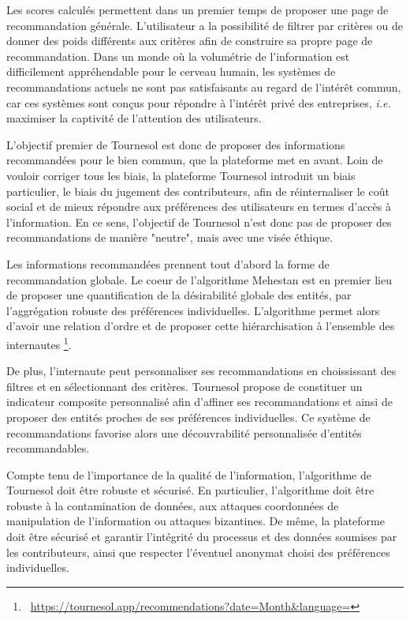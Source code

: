 Les scores calculés permettent dans un premier temps de proposer une page de recommandation générale. L'utilisateur a la possibilité de filtrer par critères ou de donner des poids différents aux critères afin de construire sa propre page de recommandation. Dans un monde où la volumétrie de l'information est difficilement appréhendable pour le cerveau humain, les systèmes de recommandations actuels ne sont pas satisfaisants au regard de l'intérêt commun, car ces systèmes sont conçus pour répondre à l'intérêt privé des entreprises, \textit{i.e.} maximiser la captivité de l'attention des utilisateurs. 

L'objectif premier de Tournesol est donc de proposer des informations recommandées pour le bien commun, que la plateforme met en avant. Loin de vouloir corriger tous les biais, la plateforme Tournesol introduit un biais particulier, le biais du jugement des contributeurs, afin de réinternaliser le coût social et de mieux répondre aux préférences des utilisateurs en termes d'accès à l'information. En ce sens, l'objectif de Tournesol n'est donc pas de proposer des recommandations de manière "neutre", mais avec une visée éthique.

Les informations recommandées prennent tout d'abord la forme de recommandation globale. Le coeur de l'algorithme Mehestan est en premier lieu de proposer une quantification de la désirabilité globale des entités, par l'aggrégation robuste des préférences individuelles. L'algorithme permet alors d'avoir une relation d'ordre et de proposer cette hiérarchisation à l'ensemble des internautes \footnote{~\href{https://tournesol.app/recommendations?date=Month&language=}{https://tournesol.app/recommendations?date=Month&language=}}.

De plus, l'internaute peut personnaliser ses recommandations en choississant des filtres et en sélectionnant des critères. Tournesol propose de constituer un indicateur composite personnalisé afin d'affiner ses recommandations et ainsi de proposer des entités proches de ses préférences individuelles. Ce système de recommandations favorise alors une découvrabilité personnalisée d'entités recommandables.

Compte tenu de l'importance de la qualité de l'information, l'algorithme de Tournesol doit être robuste et sécurisé. En particulier, l'algorithme doit être robuste à la contamination de données, aux attaques coordonnées de manipulation de l'information ou attaques bizantines. De même, la plateforme doit être sécurisé et garantir l'intégrité du processus et des données soumises par les contributeurs, ainsi que respecter l'éventuel anonymat choisi des préférences individuelles.


